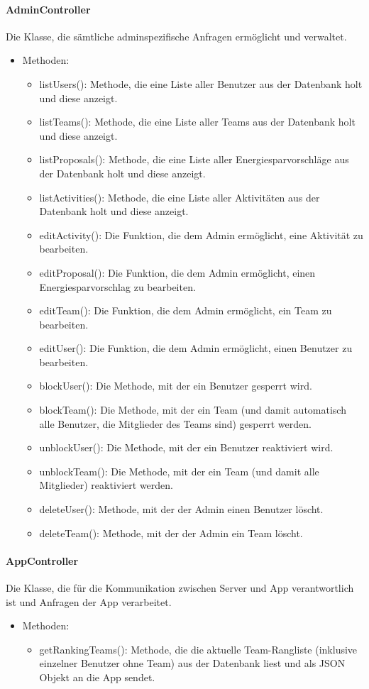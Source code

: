 	\paragraph{AdminController}Die Klasse, die s\"amtliche adminspezifische Anfragen erm\"oglicht und verwaltet.
		\begin{itemize}
			\item Methoden:
			\begin{itemize}
				\item listUsers(): Methode, die eine Liste aller Benutzer aus der Datenbank holt und diese anzeigt.
				\item listTeams(): Methode, die eine Liste aller Teams aus der Datenbank holt und diese anzeigt.
				\item listProposals(): Methode, die eine Liste aller Energiesparvorschl\"age aus der Datenbank holt und diese anzeigt.
				\item listActivities(): Methode, die eine Liste aller Aktivit\"aten aus der Datenbank holt und diese anzeigt.
				\item editActivity(): Die Funktion, die dem Admin erm\"oglicht, eine Aktivit\"at zu bearbeiten.
				\item editProposal(): Die Funktion, die dem Admin erm\"oglicht, einen Energiesparvorschlag zu bearbeiten.
				\item editTeam(): Die Funktion, die dem Admin erm\"oglicht, ein Team zu bearbeiten.
				\item editUser(): Die Funktion, die dem Admin erm\"oglicht, einen Benutzer zu bearbeiten.
				\item blockUser(): Die Methode, mit der ein Benutzer gesperrt wird.
				\item blockTeam(): Die Methode, mit der ein Team (und damit automatisch alle Benutzer, die Mitglieder des Teams sind) gesperrt werden.
				\item unblockUser(): Die Methode, mit der ein Benutzer reaktiviert wird.
				\item unblockTeam(): Die Methode, mit der ein Team (und damit alle Mitglieder) reaktiviert werden.
				\item deleteUser(): Methode, mit der der Admin einen Benutzer l\"oscht.
				\item deleteTeam(): Methode, mit der der Admin ein Team l\"oscht.
			\end{itemize}
		\end{itemize}
	\paragraph{AppController}Die Klasse, die f\"ur die Kommunikation zwischen Server und App verantwortlich ist und Anfragen der App verarbeitet.
		\begin{itemize}
			\item Methoden:
			\begin{itemize}
				\item getRankingTeams(): Methode, die die aktuelle Team-Rangliste (inklusive einzelner Benutzer ohne Team) aus der Datenbank liest und als JSON Objekt an die App sendet.
			\end{itemize}
		\end{itemize}
